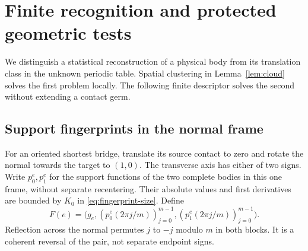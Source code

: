 \section{Finite recognition and protected geometric tests}\label{sec:recognition}
We distinguish a statistical reconstruction of a physical body from its
translation class in the unknown periodic table. Spatial clustering in
Lemma~\ref{lem:cloud} solves the first problem locally. The following
finite descriptor solves the second without extending a contact germ.

\subsection{Support fingerprints in the normal frame}
For an oriented shortest bridge, translate its source contact to zero
and rotate the normal towards the target to $(1,0)$. The transverse axis
has either of two signs. Write $p_0^e,p_1^e$ for the support functions of
the two complete bodies in this one frame, without separate recentering.
Their absolute values and first derivatives are bounded by $K_0$ in
\eqref{eq:fingerprint-size}. Define
\begin{equation}\label{eq:descriptor}
 F(e)=\bigl(g_e,(p_0^e(2\pi j/m))_{j=0}^{m-1},
                    (p_1^e(2\pi j/m))_{j=0}^{m-1}\bigr).
\end{equation}
Reflection across the normal permutes $j$ to $-j$ modulo $m$ in both
blocks. It is a coherent reversal of the pair, not separate endpoint signs.


